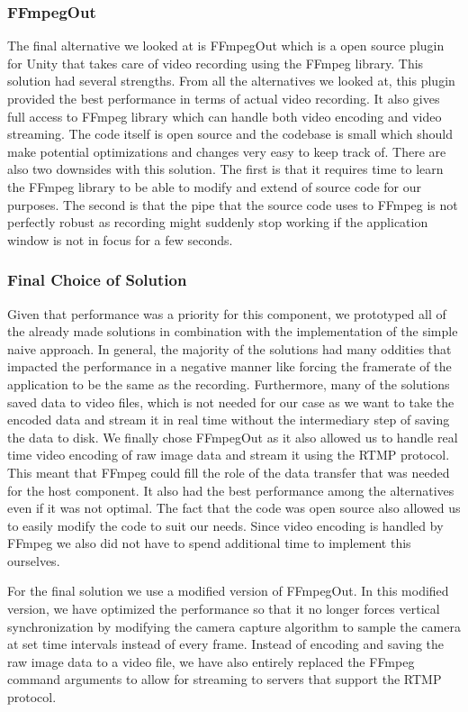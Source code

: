 \subsubsection{FFmpegOut}
The final alternative we looked at is FFmpegOut\cite{ffmpegOut} which is a open source plugin for Unity that takes care of video recording using the FFmpeg\cite{ffmpeg} library. This solution had several strengths. From all the alternatives we looked at, this plugin provided the best performance in terms of actual video recording. It also gives full access to FFmpeg library which can handle both video encoding and video streaming. The code itself is open source and the codebase is small which should make potential optimizations and changes very easy to keep track of. There are also two downsides with this solution. The first is that it requires time to learn the FFmpeg library to be able to modify and extend of source code for our purposes. The second is that the pipe that the source code uses to FFmpeg is not perfectly robust as recording might suddenly stop working if the application window is not in focus for a few seconds.  

\subsubsection{Final Choice of Solution}
Given that performance was a priority for this component, we prototyped all of the already made solutions in combination with the implementation of the simple naive approach. In general, the majority of the solutions had many oddities that impacted the performance in a negative manner like forcing the framerate of the application to be the same as the recording. Furthermore, many of the solutions saved data to video files, which is not needed for our case as we want to take the encoded data and stream it in real time without the intermediary step of saving the data to disk. We finally chose FFmpegOut as it also allowed us to handle real time video encoding of raw image data and stream it using the RTMP protocol. This meant that FFmpeg could fill the role of the data transfer that was needed for the host component. It also had the best performance among the alternatives even if it was not optimal. The fact that the code was open source also allowed us to easily modify the code to suit our needs. Since video encoding is handled by FFmpeg we also did not have to spend additional time to implement this ourselves. 

For the final solution we use a modified version of FFmpegOut. In this modified version, we have optimized the performance so that it no longer forces vertical synchronization by modifying the camera capture algorithm to sample the camera at set time intervals instead of every frame. Instead of encoding and saving the raw image data to a video file, we have also entirely replaced the FFmpeg command arguments to allow for streaming to servers that support the RTMP protocol. 
    
